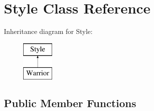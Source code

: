 \hypertarget{class_style}{}\section{Style Class Reference}
\label{class_style}
Inheritance diagram for Style\+:\begin{figure}[H]
\begin{center}
\leavevmode
\includegraphics[height=2.000000cm]{class_style}
\end{center}
\end{figure}
\subsection*{Public Member Functions}
